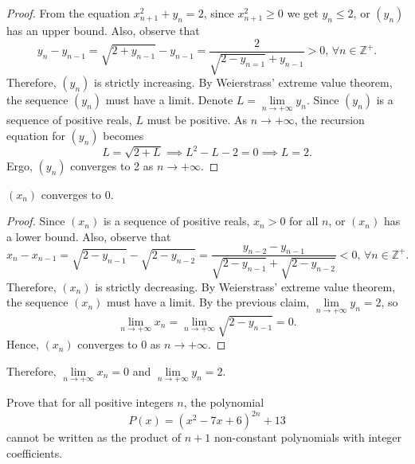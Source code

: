 \documentclass[11pt]{article}
\begin{document}
\begin{solution}
            \begin{proof}
                From the equation \(x_{n+1}^2 + y_n = 2\), since \(x_{n+1}^2 \geq 0\) we get \(y_n \leq 2\), or \((y_n)\) has an upper bound. Also, observe that
                \[y_n - y_{n-1} = \sqrt{2 + y_{n-1}} - y_{n-1} = \frac{2}{\sqrt{2 - y_{n=1}} + y_{n-1}} > 0 \text{, } \forall n \in \mathbb{Z}^+.\]
                Therefore, \((y_n)\) is strictly increasing. By Weierstrass' extreme value theorem, the sequence \((y_n)\) must have a limit. Denote \(L = \lim\limits_{n \to +\infty} y_n\). Since \((y_n)\) is a sequence of positive reals, \(L\) must be positive. As \(n \to +\infty\), the recursion equation for \((y_n)\) becomes
                \[L = \sqrt{2 + L} \implies L^2 - L - 2 = 0 \implies L = 2.\]
                Ergo, \((y_n)\) converges to 2 as \(n \to +\infty\).
            \end{proof}

            \begin{claim}
                \((x_n)\) converges to 0.
            \end{claim}

            \begin{proof}
                Since \((x_n)\) is a sequence of positive reals, \(x_n > 0\) for all \(n\), or \((x_n)\) has a lower bound. Also, observe that
                \[x_n - x_{n-1} = \sqrt{2 - y_{n-1}} - \sqrt{2 - y_{n-2}} = \frac{y_{n-2} - y_{n-1}}{\sqrt{2 - y_{n-1}} + \sqrt{2 - y_{n-2}}} < 0 \text{, } \forall n \in \mathbb{Z}^+.\]
                Therefore, \((x_n)\) is strictly decreasing. By Weierstrass' extreme value theorem, the sequence \((x_n)\) must have a limit. By the previous claim, \(\lim\limits_{n \to +\infty} y_n = 2\), so
                \[\lim\limits_{n \to +\infty} x_n = \lim\limits_{n \to +\infty} \sqrt{2 - y_{n-1}} = 0.\]
                Hence, \((x_n)\) converges to 0 as \(n \to +\infty\).
            \end{proof}

            Therefore, \(\lim\limits_{n \to +\infty} x_n = 0\) and \(\lim\limits_{n \to +\infty} y_n = 2\).
        \end{solution}

        \newpage

        \begin{problem}
            Prove that for all positive integers \(n\), the polynomial
            \[P(x) = (x^2 - 7x + 6)^{2n} + 13\]
            cannot be written as the product of \(n + 1\) non-constant polynomials with integer coefficients.
        \end{problem}
\end{document}
